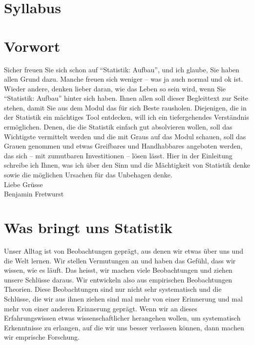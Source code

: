 \documentclass[
  10pt,
  letterpaper,
  a4paper, twoside]{scrreprt}
\begin{document}

\section*{Syllabus}\label{syllabus}


\section*{Vorwort}\label{vorwort}


Sicher freuen Sie sich schon auf \enquote{Statistik: Aufbau}, und ich
glaube, Sie haben allen Grund dazu. Manche freuen sich weniger -- was ja
auch normal und ok ist. Wieder andere, denken lieber daran, wie das
Leben so sein wird, wenn Sie \enquote{Statistik: Aufbau} hinter sich
haben. Ihnen allen soll dieser Begleittext zur Seite stehen, damit Sie
aus dem Modul das für sich Beste rausholen. Diejenigen, die in der
Statistik ein mächtiges Tool entdecken, will ich ein tiefergehendes
Verständnis ermöglichen. Denen, die die Statistik einfach gut
absolvieren wollen, soll das Wichtigste vermittelt werden und die mit
Graus auf das Modul schauen, soll das Grauen genommen und etwas
Greifbares und Handhabbares angeboten werden, das sich -- mit zumutbaren
Investitionen -- lösen lässt. Hier in der Einleitung schreibe ich Ihnen,
was ich über den Sinn und die Mächtigkeit von Statistik denke sowie die
möglichen Ursachen für das Unbehagen denke.\\
\noindent Liebe Grüsse\\
Benjamin Fretwurst

\section*{Was bringt uns Statistik}\label{was-bringt-uns-statistik}


Unser Alltag ist von Beobachtungen geprägt, aus denen wir etwas über uns
und die Welt lernen. Wir stellen Vermutungen an und haben das Gefühl,
dass wir wissen, wie es läuft. Das heisst, wir machen viele
Beobachtungen und ziehen unsere Schlüsse daraus. Wir entwickeln also aus
empirischen Beobachtungen Theorien. Diese Beobachtungen sind nur nicht
sehr systematisch und die Schlüsse, die wir aus ihnen ziehen sind mal
mehr von einer Erinnerung und mal mehr von einer anderen Erinnerung
geprägt. Wenn wir an dieses Erfahrungswissen etwas wissenschaftlicher
herangehen wollen, um systematisch Erkenntnisse zu erlangen, auf die wir
uns besser verlassen können, dann machen wir emprische Forschung.
\end{document}
